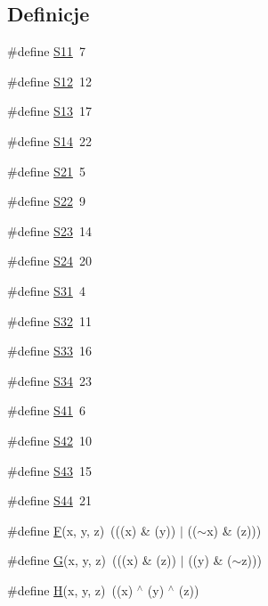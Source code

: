 \subsection*{Definicje}
\begin{CompactItemize}
\item 
\#define \hyperlink{a00009_51398c0e5541164ad4d6615880073305}{S11}~7
\item 
\#define \hyperlink{a00009_1ec499cd0e54ecc28c2ac2afea5b038e}{S12}~12
\item 
\#define \hyperlink{a00009_aeec90429105fb54d853dd4fc7027a54}{S13}~17
\item 
\#define \hyperlink{a00009_78342b0ccde2ed12fdf19a113cc266cf}{S14}~22
\item 
\#define \hyperlink{a00009_b6d5354f647a0e7592a1f051fc8377b2}{S21}~5
\item 
\#define \hyperlink{a00009_ddad30455da936bc1879ee9c72b46d59}{S22}~9
\item 
\#define \hyperlink{a00009_6321a8b29628936f76e9e78cf5bda95f}{S23}~14
\item 
\#define \hyperlink{a00009_0c09eb77d30a0d5f9154914147b86c20}{S24}~20
\item 
\#define \hyperlink{a00009_ef26590f8a880ee6f4a158168defcd89}{S31}~4
\item 
\#define \hyperlink{a00009_1d512424dd8a91e0a5bcc98563f33914}{S32}~11
\item 
\#define \hyperlink{a00009_1c854214533f6220e859b0063196abb3}{S33}~16
\item 
\#define \hyperlink{a00009_f6472be1d535970afee8e5266a74aa07}{S34}~23
\item 
\#define \hyperlink{a00009_b674ba129e588da55d1d494e1cf3c15e}{S41}~6
\item 
\#define \hyperlink{a00009_268ef1a49114a94b931cc6b313e3cd1b}{S42}~10
\item 
\#define \hyperlink{a00009_5aaa7121f39650d472746942ca68f959}{S43}~15
\item 
\#define \hyperlink{a00009_6a3989af72b55d169bd73a66f8620aae}{S44}~21
\item 
\#define \hyperlink{a00009_96d73bbd7af15cb1fc38c3f4a3bd82e9}{F}(x, y, z)~(((x) \& (y)) $|$ (($\sim$x) \& (z)))
\item 
\#define \hyperlink{a00009_d96b7cf3182ce2ba85e5a7a93b12c441}{G}(x, y, z)~(((x) \& (z)) $|$ ((y) \& ($\sim$z)))
\item 
\#define \hyperlink{a00009_e42219072d798876e6b08e6b78614ff6}{H}(x, y, z)~((x) $^\wedge$ (y) $^\wedge$ (z))
\item 

\end{CompactItemize}
